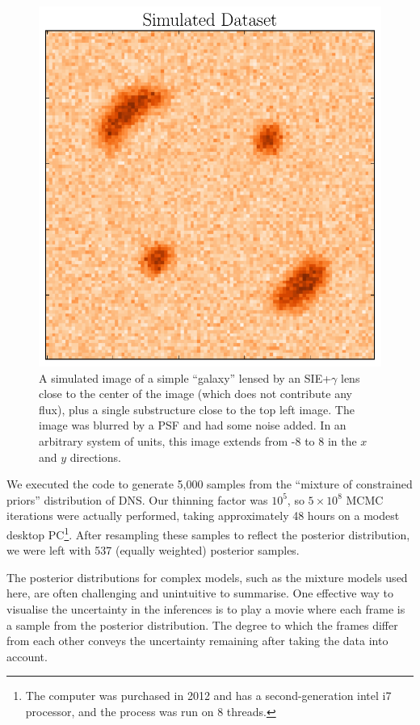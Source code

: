 \documentclass[useAMS,usenatbib]{mn2e}
\begin{document}
\begin{figure}
\begin{center}
\includegraphics[scale=0.5]{image1.pdf}
\caption{A simulated image of a simple ``galaxy'' lensed by an SIE+$\gamma$
lens close to the center of the image (which does not contribute any flux), plus a
single substructure close to the top left image.
The image was blurred by a PSF and had some noise added.
In an arbitrary system of units, this image extends from -8 to 8 in the
$x$ and $y$ directions.\label{fig:image1}}
\end{center}
\end{figure}

We executed the code to generate 5,000 samples from the ``mixture of
constrained priors'' distribution of DNS. Our thinning factor was $10^5$,
so $5 \times 10^8$ MCMC iterations were actually performed, taking approximately
48 hours on a modest desktop PC\footnote{The computer was purchased in 2012
and has a second-generation intel i7 processor, and the process was run on
8 threads.}. After resampling these samples to
reflect the posterior distribution, we were left with 537
(equally weighted) posterior samples.

The posterior distributions for complex models, such as the mixture models used here, are often challenging and unintuitive to summarise. One effective way
to visualise the uncertainty in the inferences is to play a movie where each
frame is a sample from the posterior distribution. The degree to which the
frames differ from each other conveys the uncertainty remaining after taking
the data into account.
\end{document}
